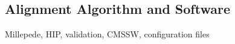 \subsection{Alignment Algorithm and Software}
Millepede, HIP, validation, CMSSW, configuration files
